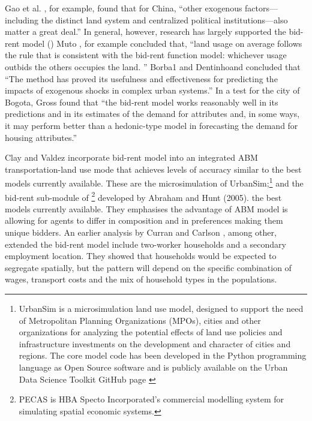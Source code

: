 Gao et al. \cite{GaoJinlong2020BtbT}, for example,  found  that for China, ``other exogenous  factors---including the distinct land system  and centralized political institutions---also matter a great deal.'' In general, however, 
research has largely supported the bid-rent model (\cite{mutoEstimationBidRent2006, wheatonBidRentApproach1977}) Muto \cite{mutoEstimationBidRent2006}, for example concluded that,  ``land usage on average follows the rule that is consistent with the bid-rent function model: whichever usage outbids the others occupies the land. ''  Borba1 and Dentinhoand \cite{borbaEvaluationUrbanScenarios2016} concluded that ``The method has proved its usefulness and effectiveness for predicting the impacts of exogenous shocks in complex urban systems.'' 
%
In a test for the city of Bogota, Gross \cite{grossEstimatingWillingnessPay1988} found that  ``the bid-rent model works reasonably well in its predictions and in its estimates of the demand for attributes and, in some ways, it may perform better than a hedonic-type model in forecasting the demand for housing attributes.'' 

Clay and Valdez incorporate bid-rent model into an integrated ABM transportation-land use mode that achieves levels of accuracy similar to the best models currently available. These are the microsimulation of UrbanSim;\footnote{UrbanSim is a microsimulation land use model, designed to support the need of Metropolitan Planning Organizations (MPOs), cities and other organizations for analyzing the potential effects of land use policies and infrastructure investments on the development and character of cities and regions. The core model code has been developed in the Python programming language as Open Source software and is publicly available on the Urban Data Science Toolkit GitHub page \cite{waddellmodellinurbandev2002}} and the bid-rent sub-module of \footnote{PECAS is  HBA Specto Incorporated's commercial modelling system  for simulating spatial economic systems.} developed by Abraham and Hunt (2005). the best models currently available. They emphasises the advantage of ABM model is allowing for agents to differ in composition and in preferences making them unique bidders. 
An earlier analysis by Curran and Carlson \cite{curranTheoryResidentialLocation1982}, among other, extended the bid-rent model include two-worker households and a secondary employment location. They showed that households would be expected to segregate spatially, but the pattern will depend on the specific combination of wages, transport costs and the mix of household types in the populations. 

